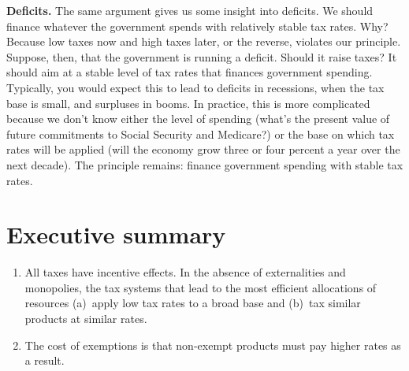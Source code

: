 \textbf{Deficits.} The same argument gives us some insight into deficits. We should finance whatever the government spends
with relatively stable tax rates.
Why?  Because low taxes now and high taxes later, or the reverse,
violates our principle.
Suppose, then, that the government is running a deficit.
Should it raise taxes?
It should aim at a stable level of tax rates
that finances government spending.
Typically, you would expect this to lead to deficits in recessions,
when the tax base is small, and surpluses in booms.
In practice, this is more complicated because we don't know either the level
of spending (what's the present value of future commitments to
Social Security and Medicare?)
or the base on which tax rates will be applied
(will the economy grow three or four percent a year over the next decade).
The principle remains:
finance government spending with stable tax rates.

\begin{comment}
{\it Tax arbitrage. \index{tax! tax arbitrage}}
Differences in tax rates lead to obvious incentives to relabel
a high-tax item as a low-tax item.
In the UK, taxes are more favorable to capital expenditures
on equipment than structures
(equipment is expensed, structures are amortized),
so there's an incentive for firms to interpret equipment broadly.
In Ireland, the corporate tax rate is very low,
so multinational firms have an incentive to shift profits from
(say) the US to Ireland.
(How might they do this?)
In the US, corporate taxes place a cap on the deductability of
executive salaries, but not on other forms of compensation (stock options,
for example), which creates an incentive for firms to pay executives
through the latter.
\end{comment}


\section*{Executive summary}

\begin{enumerate}

\item All taxes have incentive effects.  In the absence of externalities and monopolies, the tax
systems that lead to the most efficient allocations of resources
(a)~apply low tax rates to a broad base
and (b)~tax similar products at similar rates.

\item The cost of exemptions is that non-exempt products must pay higher rates as a result.

\end{enumerate}


